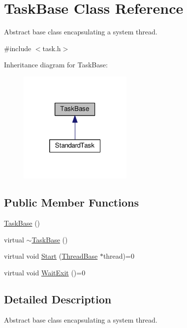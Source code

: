 \hypertarget{classTaskBase}{}\section{Task\+Base Class Reference}
\label{classTaskBase}


Abstract base class encapsulating a system thread.  




{\ttfamily \#include $<$task.\+h$>$}



Inheritance diagram for Task\+Base\+:
\nopagebreak
\begin{figure}[H]
\begin{center}
\leavevmode
\includegraphics[width=157pt]{d2/d71/classTaskBase__inherit__graph}
\end{center}
\end{figure}
\subsection*{Public Member Functions}
\begin{DoxyCompactItemize}
\item 
\hyperlink{classTaskBase_ad1abe361d54207f1bb4e0e2f87e8251c}{Task\+Base} ()
\item 
virtual \hyperlink{classTaskBase_a1a2aee27b7a0004691b02b07c25ff041}{$\sim$\+Task\+Base} ()
\item 
virtual void \hyperlink{classTaskBase_a3f6301f160a3016d5ddc3fb0caf675b5}{Start} (\hyperlink{classThreadBase}{Thread\+Base} $\ast$thread)=0
\item 
virtual void \hyperlink{classTaskBase_a96334f8a739ffb1631965b8dd424af76}{Wait\+Exit} ()=0
\end{DoxyCompactItemize}


\subsection{Detailed Description}
Abstract base class encapsulating a system thread. 

